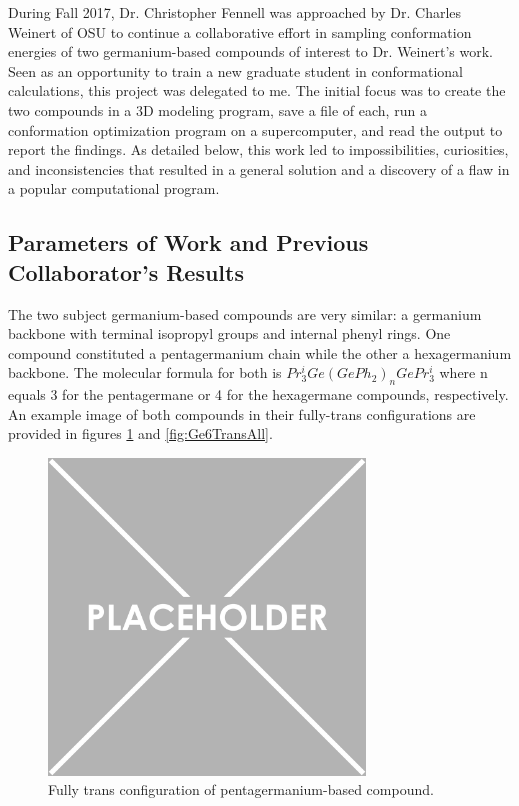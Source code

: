 During Fall 2017, Dr. Christopher Fennell was approached by Dr. Charles Weinert of OSU to continue a collaborative effort in sampling conformation energies of two germanium-based compounds of interest to Dr. Weinert's work. 
Seen as an opportunity to train a new graduate student in conformational calculations, this project was delegated to me.
The initial focus was to create the two compounds in a 3D modeling program, save a file of each, run a conformation optimization program on a supercomputer, and read the output to report the findings.
As detailed below, this work led to impossibilities, curiosities, and inconsistencies that resulted in a general solution and a discovery of a flaw in a popular computational program.

\subsection{Parameters of Work and Previous Collaborator's Results}

The two subject germanium-based compounds are very similar: a germanium backbone with terminal isopropyl groups and internal phenyl rings. 
One compound constituted a pentagermanium chain while the other a hexagermanium backbone. 
The molecular formula for both is $Pr^{i}_{3}Ge(GePh_{2})_{n}GePr^{i}_{3}$ where n equals 3 for the pentagermane or 4 for the hexagermane compounds, respectively.
An example image of both compounds in their fully-trans configurations are provided in figures \ref{fig:Ge5TransAll} and \ref{fig:Ge6TransAll}.

\begin{figure}
	
	\centering
	
	\includegraphics[width=0.75\textwidth]{placeholder.png}
	
	\caption{Fully trans configuration of pentagermanium-based compound.}
	
	\label{fig:Ge5TransAll}
	
\end{figure}

